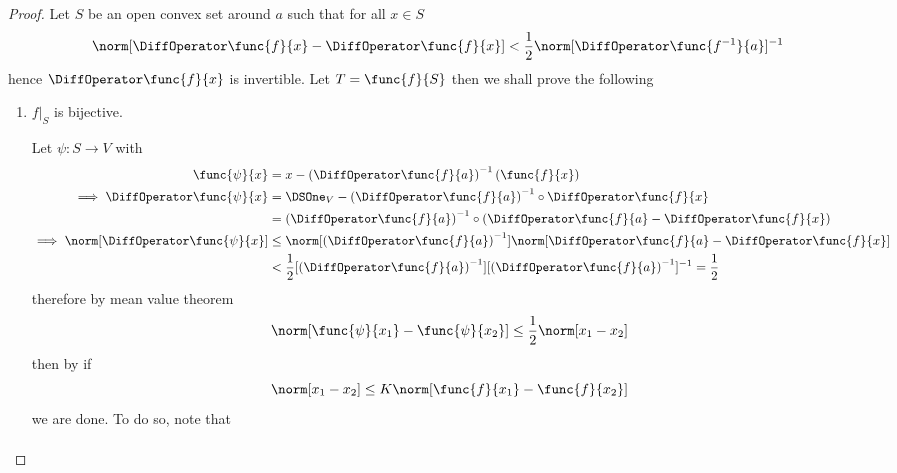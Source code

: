 \begin{proof}
    Let \(S\) be an open convex set around \(a\) such that for all \(x \in S\)
    \begin{equation*}
        \norm[\DiffOperator \func{f}{x} - \DiffOperator \func{f}{x}] < \dfrac{1}{2} \norm[\DiffOperator \func{f^{-1}}{a}]^{-1}
    \end{equation*}
    hence \(\DiffOperator \func{f}{x}\) is invertible. Let \(T = \func{f}{S}\) then we shall prove the following
    \begin{enumerate}
        \item \(f|_S\) is bijective.

              Let \(\psi : S \to V\) with
              \begin{align*}
                  \func{\psi}{x}                                & = x - \left(\DiffOperator \func{f}{a}\right)^{-1}(\func{f}{x})                                                                 \\
                  \implies \DiffOperator \func{\psi}{x }        & = \DSOne_V - \left(\DiffOperator \func{f}{a}\right)^{-1} \circ \DiffOperator \func{f}{x}                                       \\
                                                                & = \left(\DiffOperator \func{f}{a}\right)^{-1} \circ \left( \DiffOperator \func{f}{a} - \DiffOperator \func{f}{x} \right)       \\
                  \implies \norm[\DiffOperator \func{\psi}{x }] & \leq \norm[\left(\DiffOperator \func{f}{a}\right)^{-1}] \norm[\DiffOperator \func{f}{a} - \DiffOperator \func{f}{x}]           \\
                                                                & < \dfrac{1}{2} [\left(\DiffOperator \func{f}{a}\right)^{-1}] [\left(\DiffOperator \func{f}{a}\right)^{-1}]^{-1} = \dfrac{1}{2}
              \end{align*}
              therefore by mean value theorem
              \begin{equation*}
                  \norm[\func{\psi}{x_1} - \func{\psi}{x_2}] \leq \dfrac{1}{2} \norm[x_1 - x_2]
              \end{equation*}
              then by  if
              \begin{equation*}
                  \norm[x_1 - x_2] \leq K \norm[\func{f}{x_1} - \func{f}{x_2}]
              \end{equation*}
              we are done. To do so, note that
              \begin{align*}

\end{align*}
\end{enumerate}
\end{proof}
